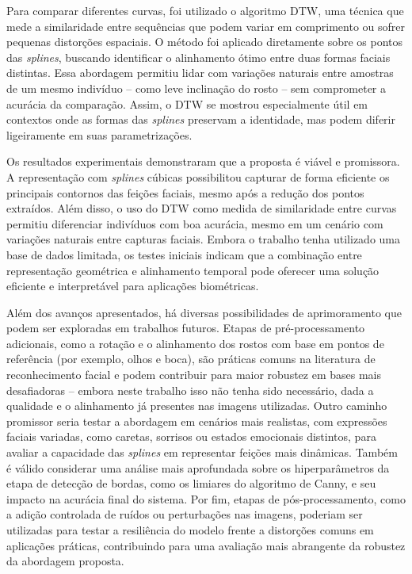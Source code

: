 Para comparar diferentes curvas, foi utilizado o algoritmo DTW, uma técnica que mede a similaridade entre sequências que podem variar em comprimento ou sofrer pequenas distorções espaciais. O método foi aplicado diretamente sobre os pontos das \textit{splines}, buscando identificar o alinhamento ótimo entre duas formas faciais distintas. Essa abordagem permitiu lidar com variações naturais entre amostras de um mesmo indivíduo -- como leve inclinação do rosto -- sem comprometer a acurácia da comparação. Assim, o DTW se mostrou especialmente útil em contextos onde as formas das \textit{splines} preservam a identidade, mas podem diferir ligeiramente em suas parametrizações.


Os resultados experimentais demonstraram que a proposta é viável e promissora. A representação com \textit{splines} cúbicas possibilitou capturar de forma eficiente os principais contornos das feições faciais, mesmo após a redução dos pontos extraídos. Além disso, o uso do DTW como medida de similaridade entre curvas permitiu diferenciar indivíduos com boa acurácia, mesmo em um cenário com variações naturais entre capturas faciais. Embora o trabalho tenha utilizado uma base de dados limitada, os testes iniciais indicam que a combinação entre representação geométrica e alinhamento temporal pode oferecer uma solução eficiente e interpretável para aplicações biométricas.

Além dos avanços apresentados, há diversas possibilidades de aprimoramento que podem ser exploradas em trabalhos futuros. Etapas de pré-processamento adicionais, como a rotação e o alinhamento dos rostos com base em pontos de referência (por exemplo, olhos e boca), são práticas comuns na literatura de reconhecimento facial e podem contribuir para maior robustez em bases mais desafiadoras -- embora neste trabalho isso não tenha sido necessário, dada a qualidade e o alinhamento já presentes nas imagens utilizadas. Outro caminho promissor seria testar a abordagem em cenários mais realistas, com expressões faciais variadas, como caretas, sorrisos ou estados emocionais distintos, para avaliar a capacidade das \textit{splines} em representar feições mais dinâmicas. Também é válido considerar uma análise mais aprofundada sobre os hiperparâmetros da etapa de detecção de bordas, como os limiares do algoritmo de Canny, e seu impacto na acurácia final do sistema. Por fim, etapas de pós-processamento, como a adição controlada de ruídos ou perturbações nas imagens, poderiam ser utilizadas para testar a resiliência do modelo frente a distorções comuns em aplicações práticas, contribuindo para uma avaliação mais abrangente da robustez da abordagem proposta.